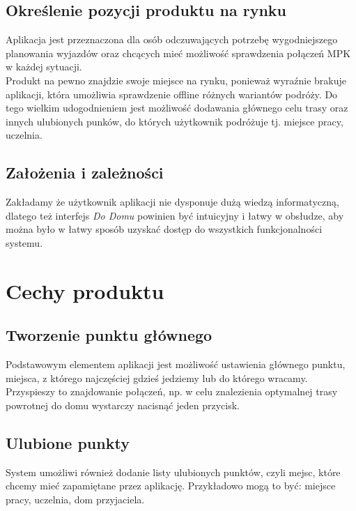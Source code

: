 \documentclass[12pt,a4paper]{article}
\begin{document}
	\subsection{Określenie pozycji produktu na rynku}
	
Aplikacja jest przeznaczona dla osób odczuwających potrzebę wygodniejszego planowania wyjazdów oraz chcących mieć możliwość sprawdzenia połączeń MPK w każdej sytuacji. \\ 

Produkt na pewno znajdzie swoje miejsce na rynku, ponieważ wyraźnie brakuje aplikacji, która umożliwia sprawdzenie offline różnych wariantów podróży. Do tego wielkim udogodnieniem jest możliwość dodawania głównego celu trasy oraz innych ulubionych punków, do których użytkownik podróżuje tj. miejsce pracy, uczelnia.

	\subsection{Założenia i zależności}	
	
Zakładamy że użytkownik aplikacji nie dysponuje dużą wiedzą informatyczną, dlatego też interfejs \textit{Do Domu} powinien być intuicyjny i łatwy w obsłudze, aby można było w łatwy sposób uzyskać dostęp do wszystkich funkcjonalności systemu.

\newpage

\section{Cechy produktu}

	\subsection{Tworzenie punktu głównego}
	Podstawowym elementem aplikacji jest możliwość ustawienia głównego punktu, miejsca, z którego najczęściej gdzieś jedziemy lub do którego wracamy. Przyspieszy to znajdowanie połączeń, np. w celu znalezienia optymalnej trasy powrotnej do domu wystarczy nacisnąć jeden przycisk. 

	\subsection{Ulubione punkty}
	System umożliwi również dodanie listy ulubionych punktów, czyli mejsc, które chcemy mieć zapamiętane przez aplikację. Przykładowo mogą to być: miejsce pracy, uczelnia, dom przyjaciela.  
\end{document}
